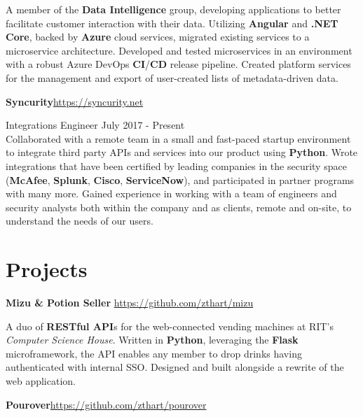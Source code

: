 \documentclass[margin,line]{resume}
\newcommand{\rurl}[1]{\hfill {\footnotesize \url{#1}}}
\begin{document}
\begin{resume}
\begin{asparablank}
	\small A member of the \textbf{Data Intelligence} group, developing applications to better facilitate customer interaction with their data.
	\small Utilizing \textbf{Angular} and \textbf{.NET Core}, backed by \textbf{Azure} cloud services, migrated existing services to a microservice architecture.
	\small Developed and tested microservices in an environment with a robust Azure DevOps \textbf{CI}/\textbf{CD} release pipeline.
	\small Created platform services for the management and export of user-created lists of metadata-driven data.
	\normalsize
	\\

	\item{\bf Syncurity}\rurl{https://syncurity.net}
	\small \item Integrations Engineer \hfill July 2017 - Present \\
         
        \small Collaborated with a remote team in a small and fast-paced startup environment to integrate third party APIs and services into our product using \textbf{Python}.
        \small Wrote integrations that have been certified by leading companies in the security space (\textbf{McAfee}, \textbf{Splunk}, \textbf{Cisco}, \textbf{ServiceNow}), and participated in partner programs with many more.
        \small Gained experience in working with a team of engineers and security analysts both within the company and as clients, remote and on-site, to understand the needs of our users.
	\end{asparablank}

\section{\mysidestyle Projects}
	\begin{asparablank}
        \item {\bf Mizu \& Potion Seller } \rurl{https://github.com/zthart/mizu}

        \small A duo of \textbf{RESTful API}s for the web-connected vending machines at RIT's 
        \textit{Computer Science House}. Written in \textbf{Python}, leveraging the \textbf{Flask} microframework, 
        the API enables any member to drop drinks having authenticated with internal SSO. Designed and built 
        alongside a rewrite of the web application.
        \\
		\item {\bf Pourover}\rurl{https://github.com/zthart/pourover}


\end{asparablank}
\end{resume}
\end{document}
